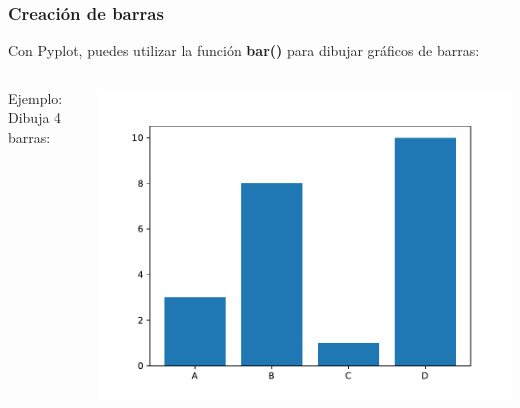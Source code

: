 \begin{frame}[fragile]
  \frametitle{Creación de barras}

  \vspace{\baselineskip}
  Con Pyplot, puedes utilizar la función \textbf{bar()}
  para dibujar gráficos de barras:
  \begin{columns}
        \begin{exampleblock}{Ejemplo:}
          Dibuja 4 barras:
          
        \end{exampleblock}
      \pausa
      \parbox{\textwidth}{\includegraphics[width=\linewidth]{ejemplos/e06.pdf}}
  \end{columns}
\end{frame}


